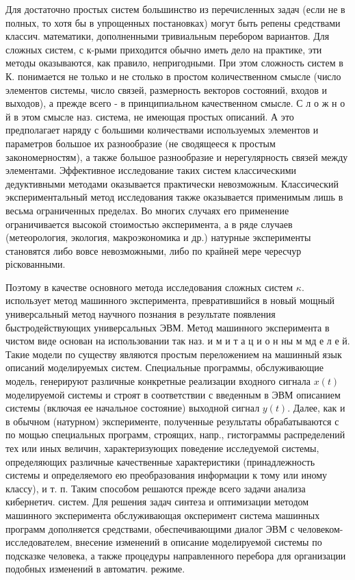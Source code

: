 \documentclass[10pt]{article}
\begin{document}
Для достаточно простых систем большинство из перечисленных задач (если не в полных, то хотя бы в упрощенных постановках) могут быть репены средствами классич. математики, дополненными тривиальным перебором вариантов. Для сложных систем, с к-рыми приходится обычно иметь дело на практике, эти методы оказываются, как правило, непригодными. При этом сложность систем в $К$. понимается не только и не столько в простом количественном смысле (число элементов системы, число связей, размерность векторов состояний, входов и выходов), а прежде всего - в принципиальном качественном смысле. С л о ж н о й в этом смысле наз. система, не имеющая простых описаний. А это предполагает наряду с большими количествами используемых элементов и параметров большое их разнообразие (не сводящееся к простым закономерностям), а также большое разнообразие и нерегулярность связей между элементами. Эффективное исследование таких систем классическими дедуктивными методами оказывается практически невозможным. Классический экспериментальный метод исследования также оказывается применимым лишь в весьма ограниченных пределах. Во многих случаях его применение ограничивается высокой стоимостью әксперимента, а в ряде случаев (метеорология, экология, макроэкономика и др.) натурные эксперименты становятся либо вовсе невозможными, либо по крайней мере чересчур ріскованными.



Поэтому в качестве основного метода исследования сложных систем $\kappa$. использует метод машинного эксперимента, превратившийся в новый мощный универсальный метод научного познания в результате появления быстродействующих универсальных ЭВМ. Метод машинного эксперимента в чистом виде основан на использовании так наз. и м и т а ц и о н ны $\mathbf{м}$ мд е л е й. Такие модели по существу являются простым переложением на машинный язык описаний моделируемых систем. Специальные программы, обслуживающие модель, генерируют различные конкретные реализации входного сигнала $x(t)$ моделируемой системы и строят в соответствии с введенным в ЭВМ описанием системы (включая ее начальное состояние) выходной сигнал $y(t)$. Далее, как и в обычном (натурном) эксперименте, полученные результаты обрабатываются с по мощью специальных программ, строящих, напр., гистограммы распределений тех или иных величин, характеризующих поведение исследуемой системы, определяющих различные качественные характеристики (принадлежность системы и определяемого ею преобразования информации к тому или иному классу), и т. п. Таким способом решаются прежде всего задачи анализа кибернетич. систем. Для решения задач синтеза и оптимизации методом машинного эксперимента обслуживающая оксперимент система машинных программ дополняется средствами, обеспечивающими диалог ЭВМ с человеком-исследователем, внесение изменений в описание моделируемой системы по подсказке человека, а также процедуры направленного перебора для организации подобных изменений в автоматич. режиме.
\end{document}
